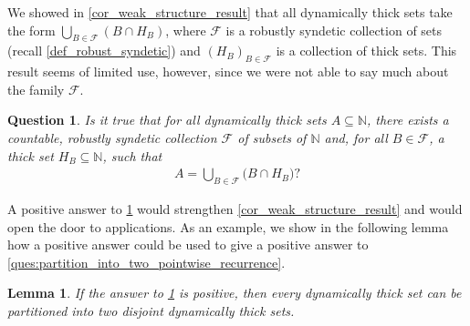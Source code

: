 \documentclass[letter,11pt]{article}
\theoremstyle{plain}
\newtheorem{lemma}[theorem]{Lemma}
\newtheorem{question}[theorem]{Question}
\theoremstyle{definition}
\theoremstyle{plain}
\theoremstyle{plain}
\numberwithin{equation}{section}
\newcommand{\N}{\mathbb{N}}
\newcommand{\family}{\mathscr{F}}
\begin{document}
We showed in \cref{cor_weak_structure_result} that all dynamically thick sets take the form $\bigcup_{B \in \family} (B \cap H_B)$, where $\family$ is a robustly syndetic collection of sets (recall \cref{def_robust_syndetic}) and $(H_B)_{B \in \family}$ is a collection of thick sets.  This result seems of limited use, however, since we were not able to say much about the family $\family$.



\begin{question}
\label{quest_robust_synd_family}
    Is it true that for all dynamically thick sets $A \subseteq \N$, there exists a countable, robustly syndetic collection $\family$ of subsets of $\N$ and, for all $B \in \family$, a thick set $H_B \subseteq \N$, such that
    \begin{align}
        \label{eqn_enhanced_dt_form}
        A = \bigcup_{B \in \family} \big( B \cap H_B \big)?
    \end{align}
\end{question}

A positive answer to \cref{quest_robust_synd_family} would strengthen \cref{cor_weak_structure_result} and would open the door to applications.  As an example, we show in the following lemma how a positive answer could be used to give a positive answer to \cref{ques:partition_into_two_pointwise_recurrence}.


\begin{lemma}
\label{lemma_solution_to_partition_problem}
    If the answer to \cref{quest_robust_synd_family} is positive, then every dynamically thick set can be partitioned into two disjoint dynamically thick sets.
\end{lemma}
\end{document}
